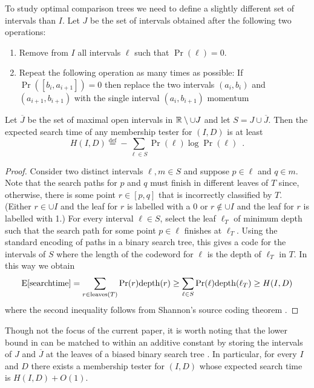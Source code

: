 \documentclass[charterfonts,lotsofwhite]{patmorin}
\newcommand{\defequals}{\stackrel{\mathrm{def}}{=}}
\begin{document}
To study optimal comparison trees we need to define a slightly
different set of intervals than $I$.  Let $J$ be the set of intervals
obtained after the following two operations:

\begin{enumerate}

\item Remove from $I$ all intervals $\ell$ such that $\Pr(\ell) = 0$.

\item Repeat the following operation as many times as possible:  If
$\Pr([b_i,a_{i+1}])=0$ then replace the two intervals $(a_i,b_i)$ and
$(a_{i+1},b_{i+1})$ with the single interval $(a_i,b_{i+1})$
momentum
\end{enumerate}

\begin{lem}
Let $\overline{J}$ be the set of maximal open intervals in
$\mathbb{R}\setminus\cup J$ and let $S=J\cup \overline{J}$.  Then the
expected search time of any membership tester for $(I,D)$ is at least
\[
    H(I,D) \defequals 
	-\sum_{\ell\in S} \Pr(\ell)\log \Pr(\ell) \enspace .
\]
\end{lem}

\begin{proof}
Consider two distinct intervals $\ell,m\in S$ and suppose $p\in\ell$
and $q\in m$.  Note that the search paths for $p$ and $q$ must finish
in different leaves of $T$ since, otherwise, there is some point
$r\in[p,q]$ that is incorrectly classified by $T$. (Either $r\in \cup
I$ and the leaf for $r$ is labelled with a 0 or $r\not\in\cup I$ and
the leaf for $r$ is labelled with 1.)  For every interval $\ell\in S$,
select the leaf $\ell_T$ of minimum depth such that the search path
for some point $p\in\ell$ finishes at $\ell_T$.  Using the
standard encoding of paths in a binary search tree, this gives a code
for the intervals of $S$ where the length of the codeword for $\ell$
is the depth of $\ell_T$ in $T$. In this way we obtain
\[
   \mathrm{E}[\mathrm{search time}] 
    = \sum_{r\in\mathrm{leaves}(T)} \Pr(r)\mathrm{depth}(r)
   \ge \sum_{\ell\in S} \Pr(\ell)\mathrm{depth}(\ell_T)
   \ge H(I,D)
\]
where the second inequality follows from Shannon's source coding
theorem \cite{X}.
\end{proof}

Though not the focus of the current paper, it is worth noting that the
lower bound in  can be matched to within an additive
constant by storing the intervals of $J$ and $\overline{J}$ at the
leaves of a biased binary search tree \cite{kXX,mXX}.  In particular,
for every $I$ and $D$ there exists a membership tester for $(I,D)$
whose expected search time is $H(I,D)+O(1)$.
\end{document}
